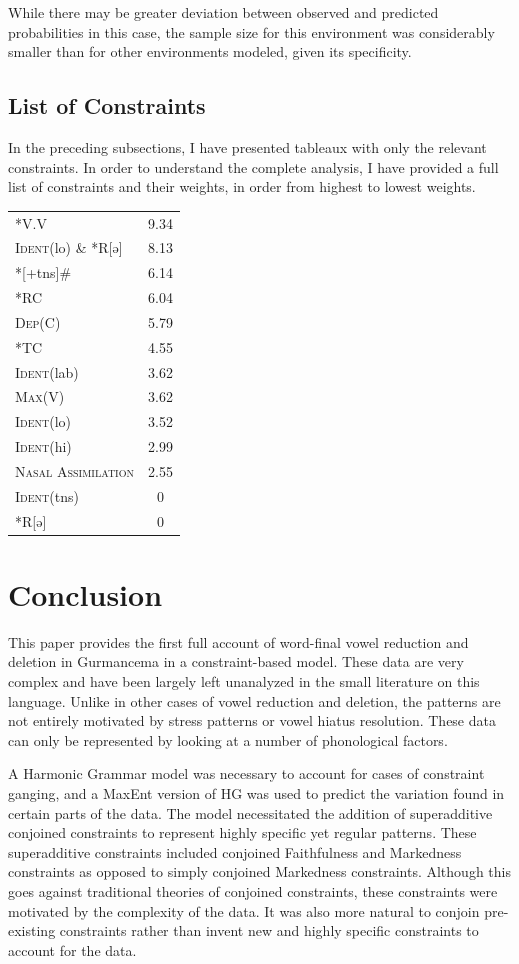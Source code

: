 \documentclass[output=paper,newtxmath,modfonts,nonflat,draftmode]{langsci/langscibook}
\begin{document}
While there may be greater deviation between observed and predicted probabilities in this case, the sample size for this environment was considerably smaller than for other environments modeled, given its specificity.

\subsection {List of Constraints} \label{fulllist}

In the preceding subsections, I have presented tableaux with only the relevant constraints. In order to understand the complete analysis, I have provided a full list of constraints and their weights, in order from highest to lowest weights. 

\ea
\begin{tabular}[t]{lS}
	*V.V &  9.34 \\
	\textsc{Ident}(lo) \&  *R[ə] &  8.13 \\
	*[+tns]\# &  6.14 \\
	*RC &  6.04\\
	\textsc{Dep}(C) &  5.79\\
	*TC &  4.55\\
	\textsc{Ident}(lab) &  3.62\\
	\textsc{Max}(V) &  3.62\\
	\textsc{Ident}(lo) &  3.52\\
	\textsc{Ident}(hi) &  2.99\\
	\textsc{Nasal Assimilation} &  2.55\\
	\textsc{Ident}(tns) &  0\\
	*R[ə] &  0\\
\end{tabular}
\z{}

\section{Conclusion}\label{sec:baird:6}

This paper provides the first full account of word-final vowel reduction and deletion in Gurmancema in a constraint-based model. These data are very complex and have been largely left unanalyzed in the small literature on this language. Unlike in other cases of vowel reduction and deletion, the patterns are not entirely motivated by stress patterns or vowel hiatus resolution. These data can only be represented by looking at a number of phonological factors.  
	
A Harmonic Grammar model was necessary to account for cases of constraint ganging, and a MaxEnt version of HG was used to predict the variation found in certain parts of the data. The model necessitated the addition of superadditive conjoined constraints to represent highly specific yet regular patterns. These superadditive constraints included conjoined Faithfulness and Markedness constraints as opposed to simply conjoined Markedness constraints. Although this goes against traditional theories of conjoined constraints, these constraints were motivated by the complexity of the data. It was also more natural to conjoin pre-existing constraints rather than invent new and highly specific constraints to account for the data.   
\end{document}
